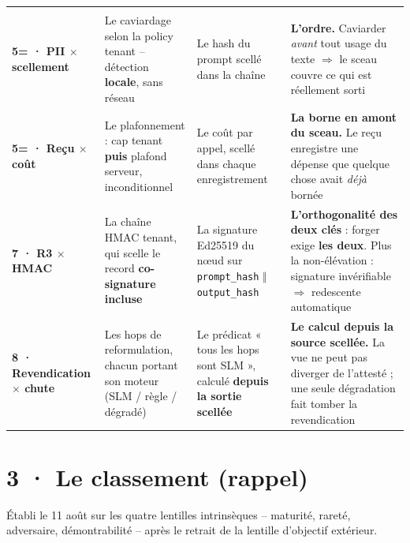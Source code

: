 \documentclass[10pt]{article}
\newcommand{\code}[1]{\texttt{\small #1}}
\newcommand{\x}{$\times$}
\begin{document}
\begin{center}
\begin{tabular}{@{}>{\raggedright\arraybackslash}p{2.75cm} >{\raggedright\arraybackslash}p{4.05cm} >{\raggedright\arraybackslash}p{4.05cm} >{\raggedright\arraybackslash}p{5.15cm}@{}}
{  servir} \\
\textbf{5= · PII \x{} scellement} &
  Le caviardage selon la policy tenant -- détection \textbf{locale}, sans réseau &
  Le hash du prompt scellé dans la chaîne &
  \textbf{L'ordre.} Caviarder \emph{avant} tout usage du texte $\Rightarrow$ le sceau couvre ce qui est
  réellement sorti \\
\textbf{5= · Reçu \x{} coût} &
  Le plafonnement : cap tenant \textbf{puis} plafond serveur, inconditionnel &
  Le coût par appel, scellé dans chaque enregistrement &
  \textbf{La borne en amont du sceau.} Le reçu enregistre une dépense que quelque chose avait
  \emph{déjà} bornée \\
\textbf{7 · R3 \x{} HMAC} &
  La chaîne HMAC tenant, qui scelle le record \textbf{co-signature incluse} &
  La signature Ed25519 du n\oe ud sur \code{prompt\_hash} $\Vert$ \code{output\_hash} &
  \textbf{L'orthogonalité des deux clés} : forger exige \textbf{les deux}. Plus la non-élévation :
  signature invérifiable $\Rightarrow$ redescente automatique \\
\textbf{8 · Revendication \x{} chute} &
  Les hops de reformulation, chacun portant son moteur (SLM / règle / dégradé) &
  Le prédicat « tous les hops sont SLM », calculé \textbf{depuis la sortie scellée} &
  \textbf{Le calcul depuis la source scellée.} La vue ne peut pas diverger de l'attesté ; une seule
  dégradation fait tomber la revendication \\
\bottomrule
\end{tabular}
\end{center}

\section{3 · Le classement (rappel)}

Établi le 11 août sur les quatre lentilles intrinsèques -- maturité, rareté, adversaire,
démontrabilité -- après le retrait de la lentille d'objectif extérieur.
\end{document}
